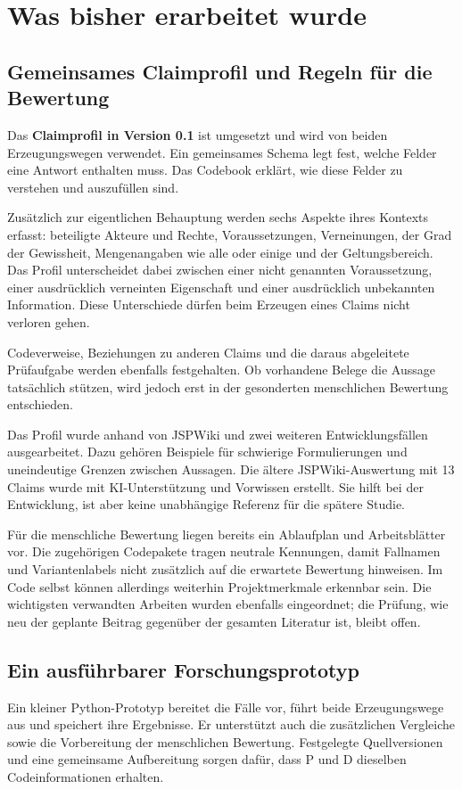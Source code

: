 \documentclass[10pt,a4paper]{article}
\begin{document}
\newpage
\section{Was bisher erarbeitet wurde}
\subsection{Gemeinsames Claimprofil und Regeln für die Bewertung}
Das \textbf{Claimprofil in Version 0.1} ist umgesetzt und wird von beiden Erzeugungswegen verwendet. Ein gemeinsames Schema legt fest, welche Felder eine Antwort enthalten muss. Das Codebook erklärt, wie diese Felder zu verstehen und auszufüllen sind.

Zusätzlich zur eigentlichen Behauptung werden sechs Aspekte ihres Kontexts erfasst: beteiligte Akteure und Rechte, Voraussetzungen, Verneinungen, der Grad der Gewissheit, Mengenangaben wie \glqq{}alle\grqq{} oder \glqq{}einige\grqq{} und der Geltungsbereich. Das Profil unterscheidet dabei zwischen einer nicht genannten Voraussetzung, einer ausdrücklich verneinten Eigenschaft und einer ausdrücklich unbekannten Information. Diese Unterschiede dürfen beim Erzeugen eines Claims nicht verloren gehen.

Codeverweise, Beziehungen zu anderen Claims und die daraus abgeleitete Prüfaufgabe werden ebenfalls festgehalten. Ob vorhandene Belege die Aussage tatsächlich stützen, wird jedoch erst in der gesonderten menschlichen Bewertung entschieden.

Das Profil wurde anhand von JSPWiki und zwei weiteren Entwicklungsfällen ausgearbeitet. Dazu gehören Beispiele für schwierige Formulierungen und uneindeutige Grenzen zwischen Aussagen. Die ältere JSPWiki-Auswertung mit 13 Claims wurde mit KI-Unterstützung und Vorwissen erstellt. Sie hilft bei der Entwicklung, ist aber keine unabhängige Referenz für die spätere Studie.

Für die menschliche Bewertung liegen bereits ein Ablaufplan und Arbeitsblätter vor. Die zugehörigen Codepakete tragen neutrale Kennungen, damit Fallnamen und Variantenlabels nicht zusätzlich auf die erwartete Bewertung hinweisen. Im Code selbst können allerdings weiterhin Projektmerkmale erkennbar sein. Die wichtigsten verwandten Arbeiten wurden ebenfalls eingeordnet; die Prüfung, wie neu der geplante Beitrag gegenüber der gesamten Literatur ist, bleibt offen.

\subsection{Ein ausführbarer Forschungsprototyp}
Ein kleiner Python-Prototyp bereitet die Fälle vor, führt beide Erzeugungswege aus und speichert ihre Ergebnisse. Er unterstützt auch die zusätzlichen Vergleiche sowie die Vorbereitung der menschlichen Bewertung. Festgelegte Quellversionen und eine gemeinsame Aufbereitung sorgen dafür, dass P und D dieselben Codeinformationen erhalten.
\end{document}
